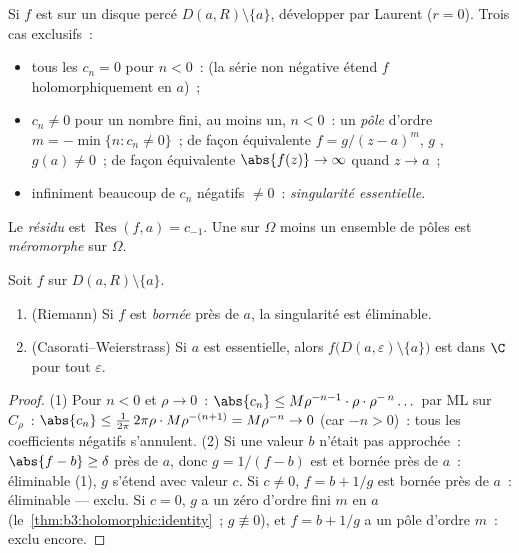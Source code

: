 \begin{definition}\label{def:b3:residues:singularities}
Si $f$ est  sur un disque percé $D(a, R)\setminus
\{a\}$, développer par Laurent ($r = 0$). Trois cas
exclusifs~:
\begin{itemize}
  \item tous les $c_n = 0$ pour $n < 0$~: \emph{} (la série non négative étend $f$
        holomorphiquement en $a$)~;
  \item $c_n \neq 0$ pour un nombre fini, au moins un, $n <
        0$~: un \emph{pôle} d'ordre $m = -\min\{n : c_n \neq
        0\}$~; de façon équivalente $f = g/(z-a)^m$, $g$
        , $g(a) \neq 0$~; de façon équivalente
        $\abs{f(z)} \to \infty$ quand $z\to a$~;
  \item infiniment beaucoup de $c_n$ négatifs $\neq 0$~:
        \emph{singularité essentielle}.
\end{itemize}
Le \emph{résidu} est $\operatorname{Res}(f, a)
= c_{-1}$. Une  sur $\Omega$ moins un
ensemble de pôles est \emph{méromorphe} sur $\Omega$.
\end{definition}

\begin{theorem}
\label{thm:b3:residues:riemanncw}
Soit $f$  sur $D(a,R)\setminus\{a\}$.
\begin{enumerate}
  \item (Riemann) Si $f$ est \emph{bornée} près de $a$, la
        singularité est éliminable.
  \item (Casorati--Weierstrass) Si $a$ est essentielle, alors
        $f\bigl(D(a,\varepsilon)\setminus\{a\}\bigr)$ est
         dans $\C$ pour tout $\varepsilon$.
\end{enumerate}
\end{theorem}

\begin{proof}
(1) Pour $n < 0$ et $\rho \to 0$~: $\abs{c_n} \leq
M\rho^{-n-1}\cdot\rho\cdot\rho^{-\,n}\dots$ par ML sur
$C_\rho$~: $\abs{c_n} \leq \frac{1}{2\pi}\,2\pi\rho\cdot
M\rho^{-(n+1)} = M\rho^{-n} \to 0$ (car $-n > 0$)~: tous les
coefficients négatifs s'annulent.
(2) Si une valeur $b$ n'était pas approchée~: $\abs{f - b}
\geq \delta$ près de $a$, donc $g = 1/(f - b)$ est
 et bornée près de $a$~: éliminable (1), $g$
s'étend avec valeur $c$. Si $c \neq 0$, $f = b + 1/g$ est
bornée près de $a$~: éliminable --- exclu. Si $c = 0$, $g$ a
un zéro d'ordre fini $m$ en $a$
(le~\cref{thm:b3:holomorphic:identity}~; $g \not\equiv 0$),
et $f = b + 1/g$ a un pôle d'ordre $m$~: exclu encore.
\end{proof}

